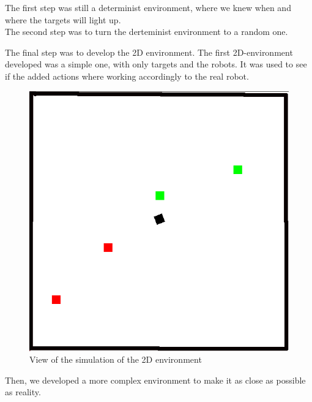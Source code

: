\documentclass[conference]{IEEEtran}
\begin{document}
The first step was still a determinist environment, where we knew when and where the targets will light up.\\

The second step was to turn the derteminist environment to a random one.

The final step was to develop the 2D environment. The first 2D-environment developed was a simple one, with only targets and the robots. It was used to see if the added actions where working accordingly to the real robot.\\

\begin{figure}
  \includegraphics[scale = 0.4]{images/2Dsimple.png}
  \caption{View of the simulation of the 2D environment}
  \label{fig:my-figure}
\end{figure}

Then, we developed a more complex environment to make it as close as possible as reality.\\
\end{document}
